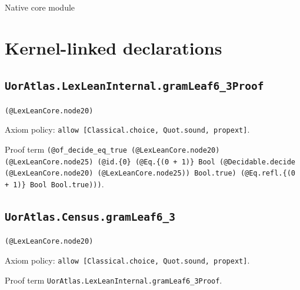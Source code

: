 \documentclass[11pt]{article}
\begin{document}
\begin{center}{\LARGE Native core module}\end{center}
\section*{Kernel-linked declarations}
\subsection*{\texttt{UorAtlas.LexLeanInternal.gramLeaf6\_3Proof}}
\noindent\texttt{(@LexLeanCore.node20)}\par
\noindent Axiom policy: \texttt{allow [Classical.choice, Quot.sound, propext]}.\par
\noindent Proof term \texttt{(@of\_decide\_eq\_true (@LexLeanCore.node20) (@LexLeanCore.node25) (@id.\{0\} (@Eq.\{(0 + 1)\} Bool (@Decidable.decide (@LexLeanCore.node20) (@LexLeanCore.node25)) Bool.true) (@Eq.refl.\{(0 + 1)\} Bool Bool.true)))}.\par
\subsection*{\texttt{UorAtlas.Census.gramLeaf6\_3}}
\noindent\texttt{(@LexLeanCore.node20)}\par
\noindent Axiom policy: \texttt{allow [Classical.choice, Quot.sound, propext]}.\par
\noindent Proof term \texttt{UorAtlas.LexLeanInternal.gramLeaf6\_3Proof}.\par
\end{document}
